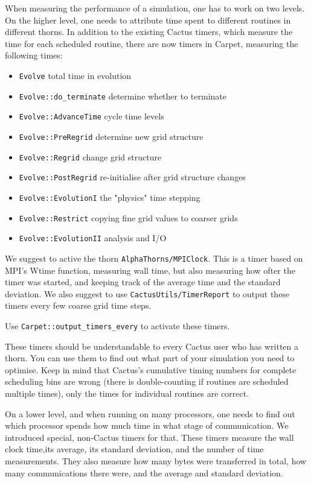 When measuring the performance of a simulation, one has to work on
two levels.  On the higher level, one needs to attribute time spent
to different routines in different thorns.  In addition to the
existing Cactus timers, which measure the time for each scheduled
routine, there are now timers in Carpet, measuring the following times:

\begin{itemize}
  \item{\tt Evolve}
    total time in evolution
  \item{\tt Evolve::do\_terminate}
    determine whether to terminate
  \item{\tt Evolve::AdvanceTime}
    cycle time levels
  \item{\tt Evolve::PreRegrid}
    determine new grid structure
  \item{\tt Evolve::Regrid}
    change grid structure
  \item{\tt Evolve::PostRegrid}
    re-initialise after grid structure changes
  \item{\tt Evolve::EvolutionI}
    the "physics" time stepping
  \item{\tt Evolve::Restrict}
    copying fine grid values to coarser grids
  \item{\tt Evolve::EvolutionII}
    analysis and I/O
\end{itemize}

We suggest to active the thorn {\tt AlphaThorns/MPIClock}.  This is a timer
based on MPI's Wtime function, measuring wall time, but also
measuring how ofter the timer was started, and keeping track of the
average time and the standard deviation.  We also suggest to use
{\tt CactusUtils/TimerReport} to output these timers every few coarse grid
time steps.

Use {\tt Carpet::output\_timers\_every} to activate these timers.

These timers should be understandable to every Cactus user who has
written a thorn.  You can use them to find out what part of your
simulation you need to optimise.  Keep in mind that Cactus's
cumulative timing numbers for complete scheduling bins are wrong
(there is double-counting if routines are scheduled multiple times),
only the times for individual routines are correct.

On a lower level, and when running on many processors, one needs to
find out which processor spends how much time in what stage of
communication.  We introduced special, non-Cactus timers for that.
These timers measure the wall clock time,its average, its standard
deviation, and the number of time measurements.  They also measure
how many bytes were transferred in total, how many communications
there were, and the average and standard deviation.

